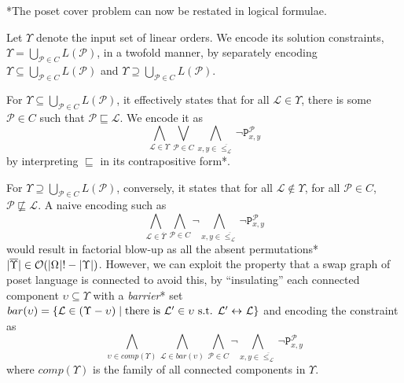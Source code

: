 \documentclass[12pt]{llncs}
\DeclarePairedDelimiter{\set}{\{}{\}}
\DeclarePairedDelimiter{\abs}{\lvert}{\rvert}
\let\oldleq\leq
\renewcommand{\leq}[1][]{\oldleq_{#1}}
\newcommand{\poset}[1]{\mathcal{#1}}
\newcommand{\uni}[1][]{\Omega_{#1}}
\newcommand{\lang}[1]{L(#1)}
\newcommand{\swap}[1][]{\leftrightarrow_{#1}}
\newcommand{\lext}{\sqsubseteq}
\newcommand{\complmt}[1]{\overline{#1}}
\newcommand{\bigo}[1]{\mathcal{O}(#1)}
\begin{document}
*The poset cover problem can now be restated in logical formulae.

Let $\Upsilon$ denote the input set of linear orders. We encode its solution constraints, $\Upsilon = \bigcup_{\poset{P} \in C} \lang{\poset{P}}$, in a twofold manner, by separately encoding $\Upsilon \subseteq \bigcup_{\poset{P} \in C} \lang{\poset{P}}$ and $\Upsilon \supseteq \bigcup_{\poset{P} \in C} \lang{\poset{P}}$.

For $\Upsilon \subseteq \bigcup_{\poset{P} \in C} \lang{\poset{P}}$, it effectively states that for all $\poset{L} \in \Upsilon$, there is some $\poset{P} \in C$ such that $\poset{P} \lext \poset{L}$. We encode it as
$$
\bigwedge_{\poset{L} \in \Upsilon} \bigvee_{\poset{P} \in C} \bigwedge_{x,y \in \complmt{\leq[\poset{L}]}} \neg \mathtt{P}_{x,y}^{\poset{P}}
$$
by interpreting $\lext$ in its contrapositive form*.

For $\Upsilon \supseteq \bigcup_{\poset{P} \in C} \lang{\poset{P}}$, conversely, it states that for all $\poset{L} \not\in \Upsilon$, for all $\poset{P} \in C$, $\poset{P} \not\lext \poset{L}$. A naive encoding such as
$$
\bigwedge_{\poset{L} \in \complmt{\Upsilon}} \bigwedge_{\poset{P} \in C} \neg \bigwedge_{x,y \in \complmt{\leq[\poset{L}]}} \neg \mathtt{P}_{x,y}^{\poset{P}}
$$
would result in factorial blow-up as all the absent permutations* $\abs{\complmt{\Upsilon}} \in \bigo{\abs{\uni}! - \abs{\Upsilon}}$. However, we can exploit the property that a swap graph of poset language is connected to avoid this, by ``insulating'' each connected component $\upsilon \subseteq \Upsilon$ with a \emph{barrier}* set $bar(\upsilon) = \set{\poset{L} \in (\Upsilon - \upsilon) \mid \text{there is } \poset{L}' \in \upsilon \text{ s.t. } \poset{L}' \swap \poset{L}}$ and encoding the constraint as
$$
\bigwedge_{\upsilon \in comp(\Upsilon)} \bigwedge_{\poset{L} \in bar(\upsilon)} \bigwedge_{\poset{P} \in C} \neg \bigwedge_{x,y \in \complmt{\leq[\poset{L}]}} \neg \mathtt{P}_{x,y}^{\poset{P}}
$$
where $comp(\Upsilon)$ is the family of all connected components in $\Upsilon$.
\end{document}
